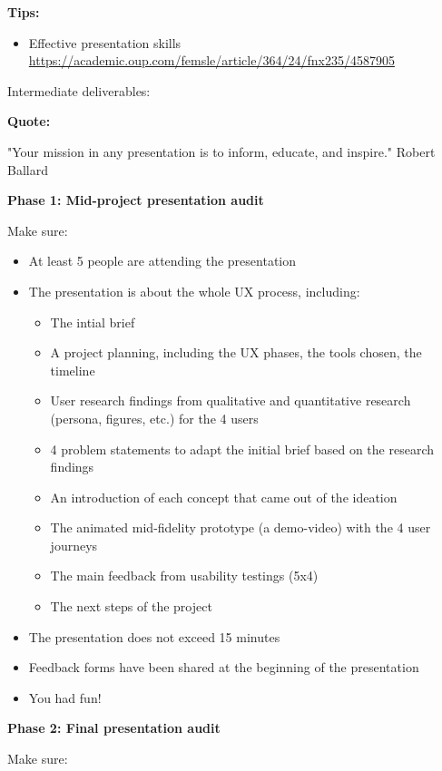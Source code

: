 \textbf{Tips:}

\begin{itemize}
\item Effective presentation skills \url{https://academic.oup.com/femsle/article/364/24/fnx235/4587905}
\end{itemize}

Intermediate deliverables:

\textbf{Quote:}

"Your mission in any presentation is to inform, educate, and inspire." Robert Ballard

\medskip

\textbf{Phase 1: Mid-project presentation audit}

Make sure:

\begin{itemize}
\item At least 5 people are attending the presentation
\item The presentation is about the whole UX process, including:
\begin{itemize}
\item The intial brief
\item A project planning, including the UX phases, the tools chosen, the timeline
\item User research findings from qualitative and quantitative research (persona, figures, etc.) for the 4 users
\item 4 problem statements to adapt the initial brief based on the research findings
\item An introduction of each concept that came out of the ideation
\item The animated mid-fidelity prototype (a demo-video) with the 4 user journeys
\item The main feedback from usability testings (5x4)
\item The next steps of the project
\end{itemize}
\item The presentation does not exceed 15 minutes
\item Feedback forms have been shared at the beginning of the presentation
\item You had fun!
\end{itemize}

\medskip

\textbf{Phase 2: Final presentation audit}

Make sure:


